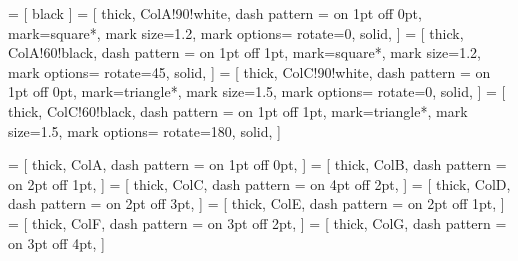 




 = [
black
]
 = [
thick, ColA!90!white, dash pattern = {on 1pt off 0pt},
	mark=square*, mark size=1.2, mark options={
		rotate=0,
		solid,
	}
]
 = [
thick, ColA!60!black, dash pattern = {on 1pt off 1pt},
	mark=square*, mark size=1.2, mark options={
		rotate=45,
		solid,
	}
]
 = [
thick, ColC!90!white, dash pattern = {on 1pt off 0pt},
	mark=triangle*, mark size=1.5, mark options={
		rotate=0,
		solid,
	}
]
 = [
thick, ColC!60!black, dash pattern = {on 1pt off 1pt},
	mark=triangle*, mark size=1.5, mark options={
		rotate=180,
		solid,
	}
]


 = [
thick, ColA, dash pattern = {on 1pt off 0pt},
]
 = [
thick, ColB, dash pattern = {on 2pt off 1pt},
]
 = [
thick, ColC, dash pattern = {on 4pt off 2pt},
]
 = [
thick, ColD, dash pattern = {on 2pt off 3pt},
]
 = [
thick, ColE, dash pattern = {on 2pt off 1pt},
]
 = [
thick, ColF, dash pattern = {on 3pt off 2pt},
]
 = [
thick, ColG, dash pattern = {on 3pt off 4pt},
]

